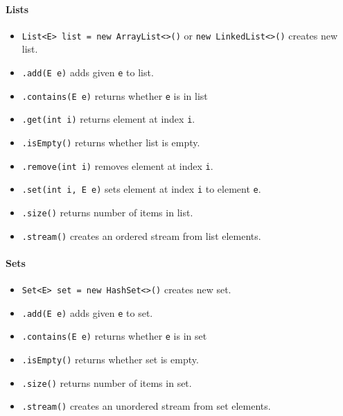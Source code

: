\documentclass[twocolumn,english]{article}
\begin{document}
\paragraph{Lists}
\begin{itemize}
\item \texttt{List\textless{}E\textgreater{} list = new ArrayList\textless{}\textgreater{}()}
or \texttt{new LinkedList\textless{}\textgreater{}()} creates new
list.
\item \texttt{.add(E e)} adds given \texttt{e} to list.
\item \texttt{.contains(E e)} returns whether \texttt{e} is in list
\item \texttt{.get(int i)} returns element at index \texttt{i}.
\item \texttt{.isEmpty()} returns whether list is empty.
\item \texttt{.remove(int i)} removes element at index \texttt{i}.
\item \texttt{.set(int i, E e)} sets element at index \texttt{i} to element
\texttt{e}.
\item \texttt{.size()} returns number of items in list.
\item \texttt{.stream()} creates an ordered stream from list elements.
\end{itemize}

\paragraph{Sets}
\begin{itemize}
\item \texttt{Set\textless{}E\textgreater{} set = new HashSet\textless{}\textgreater{}()}
creates new set.
\item \texttt{.add(E e)} adds given \texttt{e} to set.
\item \texttt{.contains(E e)} returns whether \texttt{e} is in set
\item \texttt{.isEmpty()} returns whether set is empty.
\item \texttt{.size()} returns number of items in set.
\item \texttt{.stream()} creates an unordered stream from set elements.
\end{itemize}
\end{document}
